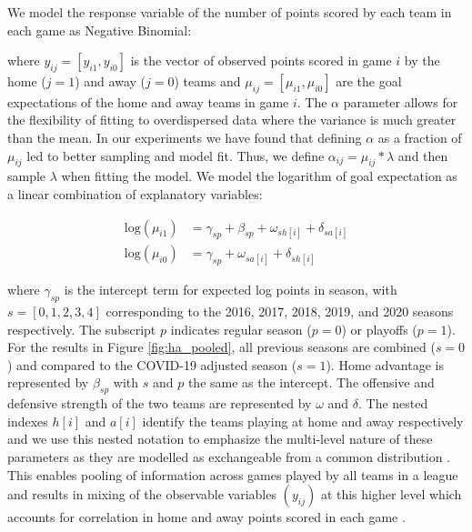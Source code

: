 We model the response variable of the number of points scored by each team in each game as Negative Binomial:

where \(y_{ij} = [y_{i1}, y_{i0}]\) is the vector of observed points scored in game \(i\) by the home (\(j=1\)) and away (\(j=0\)) teams and \(\mu_{ij} = [\mu_{i1}, \mu_{i0}]\) are the goal expectations of the home and away teams in game \(i\). The \(\alpha\) parameter allows for the flexibility of fitting to overdispersed data where the variance is much greater than the mean. In our experiments we have found that defining \(\alpha\) as a fraction of \(\mu_{ij}\) led to better sampling and model fit. Thus, we define \(\alpha_{ij} = \mu_{ij} * \lambda\) and then sample \(\lambda\) when fitting the model. We model the logarithm of goal expectation as a linear combination of explanatory variables:

\begin{equation} \label{eq:expected points}
\begin{split}
\text{log}(\mu_{i1}) &= \gamma_{sp} + \beta_{sp} + \omega_{sh[i]} + \delta_{sa[i]} \\
\text{log}(\mu_{i0}) &= \gamma_{sp} + \omega_{sa[i]} + \delta_{sh[i]}
\end{split}
\end{equation}

where \(\gamma_{sp}\) is the intercept term for expected log points in season, with \(s = [0, 1, 2, 3, 4]\) corresponding to the 2016, 2017, 2018, 2019, and 2020 seasons respectively. The subscript \(p\) indicates regular season (\(p=0\)) or playoffs (\(p=1\)). For the results in Figure \ref{fig:ha_pooled}, all previous seasons are combined (\(s=0\)) and compared to the COVID-19 adjusted season (\(s=1\)). Home advantage is represented by \(\beta_{sp}\) with \(s\) and \(p\) the same as the intercept. The offensive and defensive strength of the two teams are represented by \(\omega\) and \(\delta\). The nested indexes \(h[i]\) and \(a[i]\) identify the teams playing at home and away respectively and we use this nested notation to emphasize the multi-level nature of these parameters as they are modelled as exchangeable from a common distribution \cite{McElreath2020} \cite{Gelman2014} \cite{Gelman2006}. This enables pooling of information across games played by all teams in a league and results in mixing of the observable variables \((y_{ij})\) at this higher level which accounts for correlation in home and away points scored in each game \cite{Baio2010}.

